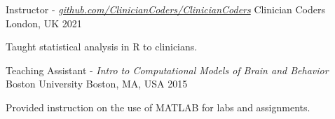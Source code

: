 %
%
%


\vspace*{0.4cm}

\begin{cventries}

    \cventry
        {Instructor - \textit{\href{https://github.com/ClinicianCoders/ClinicianCoders}{github.com/ClinicianCoders/ClinicianCoders}}}
        {Clinician Coders}
        {London, UK}
        {2021}
        {
            \begin{cvitems}
                \item Taught statistical analysis in R to clinicians.
            \end{cvitems}\vspace{1.5\baselineskip}
        }

    \vspace*{0.2cm}

    \cventry
        {Teaching Assistant - \textit{Intro to Computational Models of Brain and Behavior}}
        {Boston University}
        {Boston, MA, USA}
        {2015}
        {
            \begin{cvitems}
                \item Provided instruction on the use of MATLAB for labs and assignments.
            \end{cvitems}\vspace{1.5\baselineskip}
        }

\end{cventries}

\vspace*{-0.25cm}
